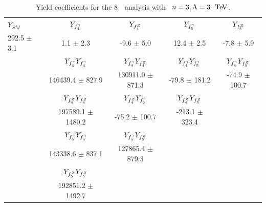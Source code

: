 
\begin{table}[htbp]
\small
\centering
\begin{tabular}{lcccc}
\hline\hline
       $Y_{SM}$ &             $Y_{f_{4}^{\gamma}}$ &             $Y_{f_{4}^{Z}}$ &             $Y_{f_{5}^{\gamma}}$ &             $Y_{f_{5}^{Z}}$ \\
292.5 $\pm$ 3.1 &             1.1 $\pm$ 2.3 &            -9.6 $\pm$ 5.0 &            12.4 $\pm$ 2.5 &            -7.8 $\pm$ 5.9 \\
\hline
                &  $Y_{f_{4}^{\gamma}}Y_{f_{4}^{\gamma}}$ &  $Y_{f_{4}^{\gamma}}Y_{f_{4}^{Z}}$ &  $Y_{f_{4}^{\gamma}}Y_{f_{5}^{\gamma}}$ &  $Y_{f_{4}^{\gamma}}Y_{f_{5}^{Z}}$ \\
                &      146439.4 $\pm$ 827.9 &      130911.0 $\pm$ 871.3 &         -79.8 $\pm$ 181.2 &         -74.9 $\pm$ 100.7 \\
\hline
                &  $Y_{f_{4}^{Z}}Y_{f_{4}^{Z}}$ &  $Y_{f_{4}^{Z}}Y_{f_{5}^{\gamma}}$ &  $Y_{f_{4}^{Z}}Y_{f_{5}^{Z}}$ \\
                &     197589.1 $\pm$ 1480.2 &         -75.2 $\pm$ 100.7 &        -213.1 $\pm$ 323.4 \\
\hline
                &  $Y_{f_{5}^{\gamma}}Y_{f_{5}^{\gamma}}$ &  $Y_{f_{5}^{\gamma}}Y_{f_{5}^{Z}}$ \\
                &      143338.6 $\pm$ 837.1 &      127865.4 $\pm$ 879.3 \\
\hline
                &  $Y_{f_{5}^{Z}}Y_{f_{5}^{Z}}$ \\
                &     192851.2 $\pm$ 1492.7 \\
\hline\hline
\end{tabular}
\caption{Yield coefficients for the 8~\tev\ analysis with \formfactor\ $n=3, \Lambda=3~\tev$.}
\label{table:TGC-yieldCoeffs-eight-n3L3}
\end{table}

